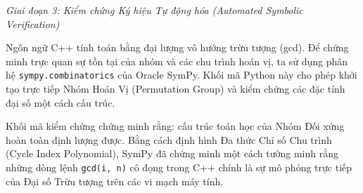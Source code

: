 \documentclass{article}
\begin{document}
\vspace{0.5em}\noindent\emph{Giai đoạn 3: Kiểm chứng Ký hiệu Tự động hóa (Automated Symbolic Verification)}

Ngôn ngữ C++ tính toán bằng đại lượng vô hướng trừu tượng (gcd). Để chứng minh trực quan sự tồn tại của nhóm và các chu trình hoán vị, ta sử dụng phân hệ \texttt{sympy.combinatorics} của Oracle \textsf{SymPy}. Khối mã Python này cho phép khởi tạo trực tiếp Nhóm Hoán Vị (Permutation Group) và kiểm chứng các đặc tính đại số một cách cấu trúc.

Khối mã kiểm chứng chứng minh rằng: cấu trúc toán học của Nhóm Đối xứng hoàn toàn định lượng được. Bằng cách định hình Đa thức Chỉ số Chu trình (Cycle Index Polynomial), \textsf{SymPy} đã chứng minh một cách tường minh rằng những dòng lệnh \texttt{gcd(i, n)} cô đọng trong C++ chính là sự mô phỏng trực tiếp của Đại số Trừu tượng trên các vi mạch máy tính.
\end{document}
